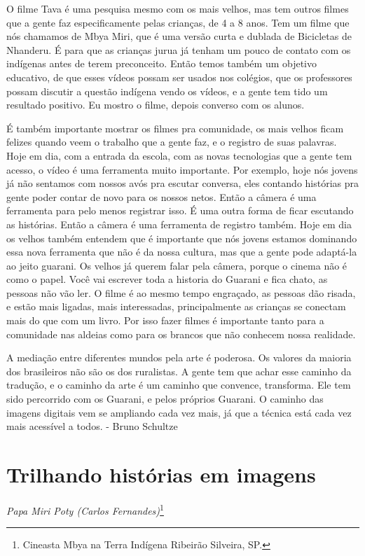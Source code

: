 O filme Tava é uma pesquisa mesmo com os mais velhos, mas tem outros
filmes que a gente faz especificamente pelas crianças, de 4 a 8 anos.
Tem um filme que nós chamamos de Mbya Miri, que é uma
versão curta e dublada de Bicicletas de Nhanderu. É para que as
crianças jurua já tenham um pouco de contato com os indígenas antes de
terem preconceito. Então temos também um objetivo educativo, de que
esses vídeos possam ser usados nos colégios, que os professores possam
discutir a questão indígena vendo os vídeos, e a gente tem tido um
resultado positivo. Eu mostro o filme, depois converso com os alunos. 

É também importante mostrar os filmes pra comunidade, os mais velhos
ficam felizes quando veem o trabalho que a gente faz, e o registro de
suas palavras. Hoje em dia, com a entrada da escola, com as novas
tecnologias que a gente tem acesso, o vídeo é uma ferramenta muito
importante. Por exemplo, hoje nós jovens já não sentamos com nossos
avós pra escutar conversa, eles contando histórias pra gente poder
contar de novo para os nossos netos. Então a câmera é uma ferramenta
para pelo menos registrar isso. É uma outra forma de ficar escutando as
histórias. Então a câmera é uma ferramenta de registro também. Hoje em
dia os velhos também entendem que é importante que nós jovens estamos
dominando essa nova ferramenta que não é da nossa cultura, mas que a
gente pode adaptá-la ao jeito guarani. Os velhos já querem falar pela
câmera, porque o cinema não é como o papel. Você vai escrever toda a
historia do Guarani e fica chato, as pessoas não vão ler. O filme é ao
mesmo tempo engraçado, as pessoas dão risada, e estão mais ligadas,
mais interessadas, principalmente as crianças se conectam mais do que
com um livro. Por isso fazer filmes é importante tanto para a
comunidade nas aldeias como para os brancos que não conhecem nossa
realidade.

A mediação entre diferentes mundos pela arte é poderosa. Os valores da
maioria dos brasileiros não são os dos ruralistas. A gente tem que
achar esse caminho da tradução, e o caminho da arte é um caminho que
convence, transforma. Ele tem sido percorrido com os Guarani, e pelos
próprios Guarani. O caminho das imagens digitais vem se ampliando cada
vez mais, já que a técnica está cada vez mais acessível a todos. -
Bruno Schultze 

\chapter{Trilhando histórias em imagens}
\begin{flushright}
\emph{Papa Miri Poty (Carlos Fernandes)}\footnote{Cineasta Mbya
na Terra Indígena Ribeirão Silveira, SP.}
\end{flushright}
\medskip

